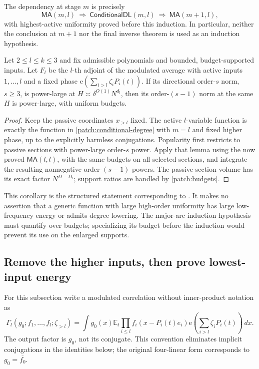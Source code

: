 \documentclass[11pt]{article}
\theoremstyle{definition}
\newcommand{\ee}[1]{\mathrm e\!\left(#1\right)}
\begin{document}
The dependency at stage $m$ is precisely
\[
 \mathsf{MA}(m,l)
 \ \Longrightarrow\ \mathsf{ConditionalDL}(m,l)
 \ \Longrightarrow\ \mathsf{MA}(m+1,l),
\]
with highest-active uniformity proved before this induction.  In particular, neither the
conclusion at $m+1$ nor the final inverse theorem is used as an induction hypothesis.

\begin{corollary}
\label{patch:structured-degree}
Let $2\leq l\leq k\leq3$ and fix admissible polynomials and bounded, budget-supported inputs.
Let $F_l$ be the $l$-th adjoint of the modulated average with active inputs $1,\ldots,l$
and a fixed phase $\ee{\sum_{i>l}\zeta_iP_i(t)}$.  If its directional order-$s$ norm,
$s\geq3$, is power-large at $H\asymp\delta^{O(1)}N^{d_l}$, then its order-$(s-1)$ norm
at the same $H$ is power-large, with uniform budgets.
\end{corollary}
\begin{proof}
Keep the passive coordinates $x_{>l}$ fixed.  The active $l$-variable function is exactly
the function in \cref{patch:conditional-degree} with $m=l$ and fixed higher phase,
up to the explicitly harmless conjugations.  Popularity first restricts to passive sections
with power-large order-$s$ power.  Apply that lemma using the now proved
$\mathsf{MA}(l,l)$, with the same budgets on all selected sections, and integrate the
resulting nonnegative order-$(s-1)$ powers.  The passive-section volume has its exact factor
$N^{D-D_l}$; support ratios are handled by \cref{patch:budgets}.
\end{proof}
This corollary is the structured statement corresponding to \cite[Lemma 4.70]{KoszEtAl}.
It makes no assertion that a generic function with large high-order uniformity has large
low-frequency energy or admits degree lowering.
The major-arc induction hypothesis must quantify over budgets; specializing its budget
before the induction would prevent its use on the enlarged supports.


\subsection{Remove the higher inputs, then prove lowest-input energy}
\label{patch:lowest-inverse}
For this subsection write a modulated correlation without inner-product notation as
\[
 \Gamma_l(g_0;f_1,\ldots,f_l;\zeta_{>l})
 =\int g_0(x)\mathbb E_t\prod_{i\leq l}f_i(x-P_i(t)e_i)
                   \ee{\sum_{i>l}\zeta_iP_i(t)}\,dx.
\]
The output factor is $g_0$, not its conjugate.  This convention eliminates implicit
conjugations in the identities below; the original four-linear form corresponds to
$g_0=\overline{f_0}$.
\end{document}
